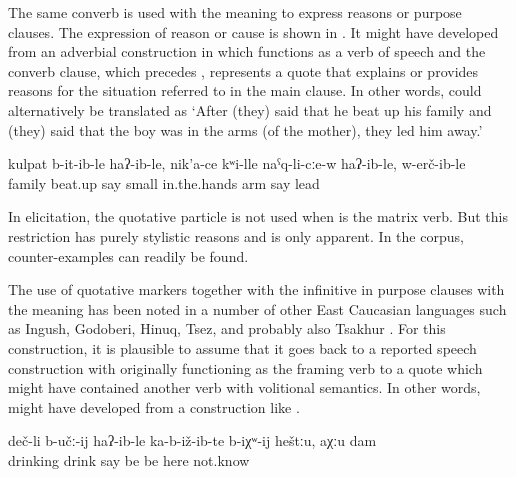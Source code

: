 The same converb is used with the meaning  to express reasons or purpose clauses. The expression of reason or cause is shown in . It might have developed from an adverbial construction in which  functions as a verb of speech and the converb clause, which precedes , represents a quote that explains or provides reasons for the situation referred to in the main clause. In other words,  could alternatively be translated as `After (they) said that he beat up his family and (they) said that the boy was in the arms (of the mother), they led him away.'

%
\begin{exe}
	\ex	\label{ex:Because he beat up his family, because the boy was in the arms (of the mother), they led him away}
	\gll	kulpat	b-it-ib-le	haʔ-ib-le,	nik'a-ce	kʷi-lle	naˁq-li-cːe-w	haʔ-ib-le,	w-erč-ib-le\\
		family	beat.up	say	small	in.the.hands	arm	say	lead\\
	\glt	{}
\end{exe}

In elicitation, the quotative particle  is not used when  is the matrix verb. But this restriction has purely stylistic reasons and is only apparent. In the corpus, counter-examples can readily be found.

The use of quotative markers together with the infinitive in purpose clauses with the meaning  has been noted in a number of other East Caucasian languages such as Ingush, Godoberi, Hinuq, Tsez, and probably also Tsakhur \citep{Forker2016c}. For this construction, it is plausible to assume that it goes back to a reported speech construction with  originally functioning as the framing verb to a quote which might have contained another verb with volitional semantics. In other words,  might have developed from a construction like .
%
\begin{exe}
	\ex	\label{ex:They probably sit down in order to drink here, I do not know}
	\gll	deč-li	b-učː-ij	haʔ-ib-le	ka-b-iž-ib-te	b-iχʷ-ij	heštːu,	aχːu	dam\\
		drinking	drink	say	be be	here	not.know	\\
	\glt	{}
\end{exe}

